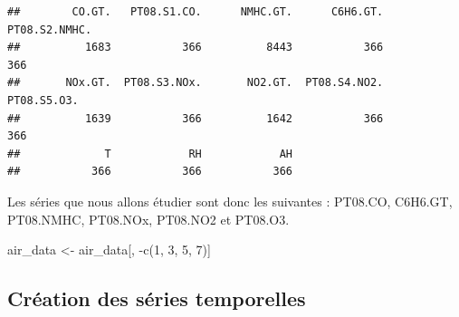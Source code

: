 \documentclass[
]{article}
\newenvironment{Shaded}{\begin{snugshade}}{\end{snugshade}}
\newcommand{\DecValTok}[1]{\textcolor[rgb]{0.00,0.00,0.81}{#1}}
\newcommand{\FunctionTok}[1]{\textcolor[rgb]{0.00,0.00,0.00}{#1}}
\newcommand{\NormalTok}[1]{#1}
\newcommand{\OtherTok}[1]{\textcolor[rgb]{0.56,0.35,0.01}{#1}}
\newcommand{\SpecialCharTok}[1]{\textcolor[rgb]{0.00,0.00,0.00}{#1}}
\begin{document}
\begin{verbatim}
##        CO.GT.   PT08.S1.CO.      NMHC.GT.      C6H6.GT. PT08.S2.NMHC. 
##          1683           366          8443           366           366 
##       NOx.GT.  PT08.S3.NOx.       NO2.GT.  PT08.S4.NO2.   PT08.S5.O3. 
##          1639           366          1642           366           366 
##             T            RH            AH 
##           366           366           366
\end{verbatim}

Les séries que nous allons étudier sont donc les suivantes :\newline
PT08.CO, C6H6.GT, PT08.NMHC, PT08.NOx, PT08.NO2 et PT08.O3.

\begin{Shaded}
\begin{Highlighting}[]
\NormalTok{air\_data }\OtherTok{\textless{}{-}}\NormalTok{ air\_data[, }\SpecialCharTok{{-}}\FunctionTok{c}\NormalTok{(}\DecValTok{1}\NormalTok{, }\DecValTok{3}\NormalTok{, }\DecValTok{5}\NormalTok{, }\DecValTok{7}\NormalTok{)]}
\end{Highlighting}
\end{Shaded}

\hypertarget{cruxe9ation-des-suxe9ries-temporelles}{%
\subsection{Création des séries
temporelles}\label{cruxe9ation-des-suxe9ries-temporelles}}
\end{document}
